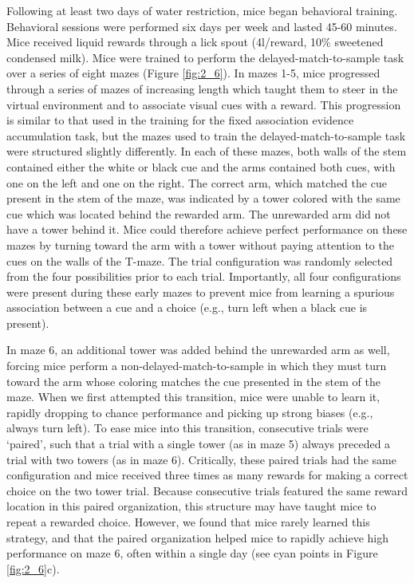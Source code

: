 Following at least two days of water restriction, mice began behavioral training. Behavioral sessions were performed six days per week and lasted 45-60 minutes. Mice received liquid rewards through a lick spout (4\textmu l/reward, 10\% sweetened condensed milk). Mice were trained to perform the delayed-match-to-sample task over a series of eight mazes (Figure \ref{fig:2_6}). In mazes 1-5, mice progressed through a series of mazes of increasing length which taught them to steer in the virtual environment and to associate visual cues with a reward. This progression is similar to that used in the training for the fixed association evidence accumulation task, but the mazes used to train the delayed-match-to-sample task were structured slightly differently. In each of these mazes, both walls of the stem contained either the white or black cue and the arms contained both cues, with one on the left and one on the right. The correct arm, which matched the cue present in the stem of the maze, was indicated by a tower colored with the same cue which was located behind the rewarded arm. The unrewarded arm did not have a tower behind it. Mice could therefore achieve perfect performance on these mazes by turning toward the arm with a tower without paying attention to the cues on the walls of the T-maze. The trial configuration was randomly selected from the four possibilities prior to each trial. Importantly, all four configurations were present during these early mazes to prevent mice from learning a spurious association between a cue and a choice (e.g., turn left when a black cue is present).

\bigskip
In maze 6, an additional tower was added behind the unrewarded arm as well, forcing mice perform a non-delayed-match-to-sample in which they must turn toward the arm whose coloring matches the cue presented in the stem of the maze. When we first attempted this transition, mice were unable to learn it, rapidly dropping to chance performance and picking up strong biases (e.g., always turn left). To ease mice into this transition, consecutive trials were ‘paired’, such that a trial with a single tower (as in maze 5) always preceded a trial with two towers (as in maze 6). Critically, these paired trials had the same configuration and mice received three times as many rewards for making a correct choice on the two tower trial. Because consecutive trials featured the same reward location in this paired organization, this structure may have taught mice to repeat a rewarded choice. However, we found that mice rarely learned this strategy, and that the paired organization helped mice to rapidly achieve high performance on maze 6, often within a single day (see cyan points in Figure \ref{fig:2_6}c). 

